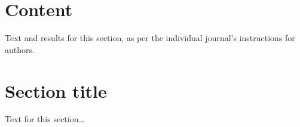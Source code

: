 \documentclass{bmcart}\usepackage[]{graphicx}\usepackage[]{color}
\begin{document}
\begin{frontmatter}
\begin{abstractbox}

\begin{keyword}
\end{keyword}


\end{abstractbox}
%

\end{frontmatter}



\section*{Content}
Text and results for this section, as per the individual journal's instructions for authors.

\section*{Section title}
Text for this section\ldots
\end{document}
